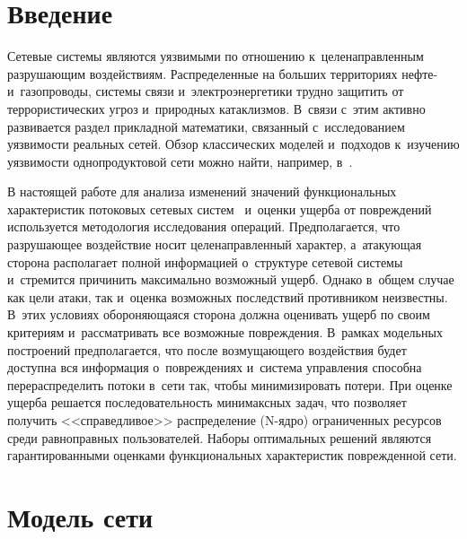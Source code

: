 



\thispagestyle{headings}

\begin{multicols}{2}

\label{st\stat}

\section{Введение}

Сетевые системы являются уязвимыми по отношению к~целенаправленным 
разрушающим воздействиям. Распределенные на больших территориях нефте- и~газопроводы, 
системы связи и~электроэнергетики трудно защитить от террористических 
угроз и~природных катаклизмов. В~связи с~этим активно развивается раздел 
прикладной математики, связанный с~исследованием уязвимости реальных сетей. 
Обзор классических моделей и~подходов к~изучению уязвимости однопродуктовой 
сети можно найти, например, в~\cite{Mur13}.

В настоящей работе для анализа изменений значений функциональных 
характеристик потоковых сетевых систем~\cite{Mal17} и~оценки ущерба от 
по\-вреж\-дений используется   методология  исследования опера\-ций. Предполагается, 
что разрушающее воздействие носит целенаправленный характер, а~атакующая 
сторона располагает полной информацией о~структуре сетевой системы и~стремится 
причинить максимально возможный ущерб. Однако в~общем случае как  цели атаки, 
так и~оценка возможных последствий противником неизвестны. 
В~этих условиях обороняющаяся сторона должна оценивать ущерб по своим
 критериям и~рассматривать все возможные повреждения. 
 В~рамках модельных построений предполагается, что после воз\-му\-ща\-юще\-го воздействия 
 будет доступна вся информация о~повреждениях и~система управления 
 способна перераспределить потоки в~сети так, чтобы минимизировать\linebreak
  потери. 
 При оценке ущерба решается последовательность минимаксных задач, что 
 позволяет получить <<справедливое>>  распределение (N-яд\-ро) 
 ограничен\-ных ресурсов среди равноправных пользователей. 
 Наборы оптимальных решений являются гарантированными оценками 
 функциональных характеристик поврежденной сети. 

\section{Модель сети}


\end{multicols}
